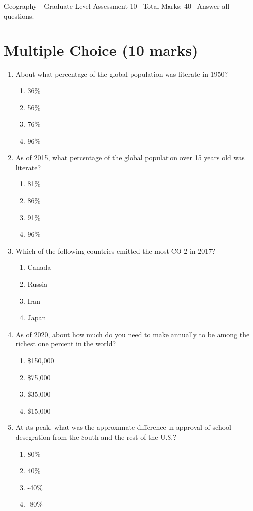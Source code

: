 \documentclass[12pt]{article}
\begin{document}
\begin{center}
Geography - Graduate Level Assessment 10 \
Total Marks: 40 \
Answer all questions.
\end{center}

\section*{Multiple Choice (10 marks)}
\begin{enumerate}[label=\arabic*.]
\item About what percentage of the global population was literate in 1950?
\begin{enumerate}[label=(\alph*)]
    \item 36\%
    \item 56\%
    \item 76\%
    \item 96\%
\end{enumerate}
\item As of 2015, what percentage of the global population over 15 years old was literate?
\begin{enumerate}[label=(\alph*)]
    \item 81\%
    \item 86\%
    \item 91\%
    \item 96\%
\end{enumerate}
\item Which of the following countries emitted the most CO 2 in 2017?
\begin{enumerate}[label=(\alph*)]
    \item Canada
    \item Russia
    \item Iran
    \item Japan
\end{enumerate}
\item As of 2020, about how much do you need to make annually to be among the richest one percent in the world?
\begin{enumerate}[label=(\alph*)]
    \item \$150,000
    \item \$75,000
    \item \$35,000
    \item \$15,000
\end{enumerate}
\item At its peak, what was the approximate difference in approval of school desegration from the South and the rest of the U.S.?
\begin{enumerate}[label=(\alph*)]
    \item 80\%
    \item 40\%
    \item -40\%
    \item -80\%
\end{enumerate}
\end{enumerate}
\end{document}

